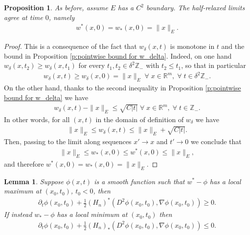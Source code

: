 \documentclass[reqno]{amsart}
\newtheorem{proposition}[theorem]{Proposition}
\newtheorem{lemma}[theorem]{Lemma}
\numberwithin{equation}{section}
\begin{document}
\begin{proposition}\label{p:half relaxed limits take inital data}
As before, assume $E$ has a $C^2$ boundary. The half-relaxed limits agree at time $0$, namely
\begin{align*}
  w^*(x,0) = w_*(x,0) = \|x\|_E.    
\end{align*}
    
\end{proposition}

\begin{proof}

This is a consequence of the fact that $w_\delta(x,t)$ is monotone in $t$ and the bound in Proposition \ref{p:pointwise bound for w_delta}. Indeed, on one hand $w_\delta(x,t_2) \geq w_\delta(x,t_1)$ for every $t_1,t_2\in \delta^2\mathbb{Z}_{-}$ with $t_2\leq t_1$, so that in particular
\begin{align*}
  w_\delta(x,t) \geq w_\delta(x,0) = \|x\|_E \;\forall\;x\in \mathbb{R}^m,\;\forall\;t\in\delta^2 \mathbb{Z}_{-}.     
\end{align*}
On the other hand, thanks to the second inequality in Proposition \ref{p:pointwise bound for w_delta} we have
\begin{align*}
  w_\delta(x,t)-\|x\|_E \leq \sqrt{C|t|} \;\forall\;x\in \mathbb{R}^m,\;\forall\;t\in\mathbb{Z}_{-}.        
\end{align*}
In other words, for all $(x,t)$ in the domain of definition of $w_\delta$ we have
\begin{align*}
  \|x\|_E \leq w_\delta(x,t) \leq \|x\|_E + \sqrt{C|t|}.   
\end{align*}
Then, passing to the limit along sequences $x'\to x$ and $t'\to 0$ we conclude that
\begin{align*}
  \|x\|_E \leq w_*(x,0)\leq w^*(x,0) \leq \|x\|_E,  
\end{align*}
and therefore $w^*(x,0)= w_*(x,0) = \|x\|_E$.
\end{proof}



\begin{lemma}\label{l:half relaxed limits are sub or super solutions} Suppose $\phi(x,t)$ is a smooth function such that $w^*-\phi$ has a local maximum at $(x_0,t_0)$, $t_0<0$, then
  \begin{align*}
    \partial_t\phi(x_0,t_0) + \tfrac{1}{2}(H_n)^*(D^2\phi(x_0,t_0),\nabla \phi(x_0,t_0)) \geq 0.   
  \end{align*}
  If instead $w_*-\phi$ has a local minimum at $(x_0,t_0)$ then
  \begin{align*}
    \partial_t\phi(x_0,t_0) + \tfrac{1}{2}(H_n)_*(D^2\phi(x_0,t_0),\nabla \phi(x_0,t_0)) \leq 0.   
  \end{align*}

\end{lemma}
\end{document}
